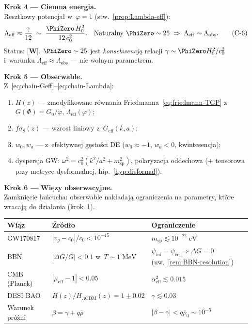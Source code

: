 \bigskip
\noindent\textbf{Krok 4 --- Ciemna energia.}\\[2pt]
Resztkowy potencja\l{} w~$\varphi = 1$
(stw.~\ref{prop:Lambda-eff}):
\begin{equation}\label{eq:chain-Lambda}
  \Lambda_{\mathrm{eff}} \approx \frac{\gamma}{12}
  \;\sim\; \frac{\PhiZero\,H_0^2}{12\,c_0^2}.
  \quad\text{Naturalny }\PhiZero \sim 25
  \;\Rightarrow\; \Lambda_{\mathrm{eff}} \sim \Lambda_{\mathrm{obs}}.
  \tag{$\mathrm{C}$-6}
\end{equation}
Status: [\textbf{W}]. $\PhiZero \sim 25$ jest
\emph{konsekwencj\k{a}} relacji
$\gamma \sim \PhiZero H_0^2/c_0^2$ i~warunku
$\Lambda_{\mathrm{eff}} \approx \Lambda_{\mathrm{obs}}$
--- nie wolnym parametrem.

\bigskip
\noindent\textbf{Krok 5 --- Obserwable.}\\[2pt]
Z~\eqref{eq:chain-Geff}--\eqref{eq:chain-Lambda}:
\begin{enumerate}[nosep, label=(\alph*)]
  \item $H(z)$ --- zmodyfikowane r\'ownania
    Friedmanna~\eqref{eq:friedmann-TGP} z~$G(\Phi) = G_0/\varphi$,
    $\Lambda_{\mathrm{eff}}(\varphi)$;
  \item $f\sigma_8(z)$ --- wzrost liniowy z~$G_{\mathrm{eff}}(k,a)$;
  \item $w_0, w_a$ --- z~efektywnej g\k{e}sto\'sci DE
    ($w_0 \approx -1$, $w_a < 0$, kwintesencja);
  \item dyspersja GW: $\omega^2 = c_0^2(k^2/a^2 + m_{\mathrm{sp}}^2)$,
    polaryzacja oddechowa (+ tensorowa przy metryce
    dysformalnej, hip.~\ref{hyp:disformal}).
\end{enumerate}

\bigskip
\noindent\textbf{Krok 6 --- Wi\k{e}zy obserwacyjne.}\\[2pt]
Zamkni\k{e}cie \l{}a\'ncucha: obserwable nak\l{}adaj\k{a}
ograniczenia na parametry, kt\'ore wracaj\k{a}
do dzia\l{}ania (krok~1).
\begin{center}\small
\begin{tabular}{@{}lll@{}}
\toprule
\textbf{Wi\k{a}z} & \textbf{\'Zr\'od\l{}o} &
  \textbf{Ograniczenie} \\
\midrule
GW170817 & $|v_g - c_0|/c_0 < 10^{-15}$ &
  $m_{\mathrm{sp}} \lesssim 10^{-22}\;\mathrm{eV}$ \\
BBN & $|\Delta G/G| < 0.1$ w~$T \sim 1\;\mathrm{MeV}$ &
  $\psi_{\mathrm{ini}} = \psi_{\mathrm{eq}} \Rightarrow \Delta G = 0$
  (uw.~\ref{rem:BBN-resolution}) \\
CMB (Planck) & $|\mu_{\mathrm{eff}} - 1| < 0.05$ &
  $\alpha_{\mathrm{eff}}^2 \lesssim 0.015$ \\
DESI BAO & $H(z)/H_{\Lambda\mathrm{CDM}}(z) = 1 \pm 0.02$ &
  $\gamma \lesssim 0.03$ \\
Warunek pr\'o\.zni & $\beta = \gamma + q\bar\rho$ &
  $|\beta - \gamma| < q\bar\rho_0 \sim 10^{-5}$ \\
\bottomrule
\end{tabular}
\end{center}

